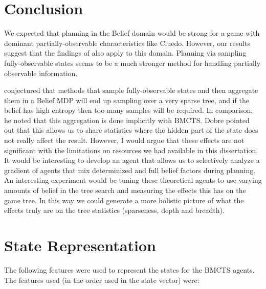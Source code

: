 \documentclass[msc, ai, twoside, notimes, logo, parskip, leftchapter, normalheadings]{infthesis}
\begin{document}
\chapter{Conclusion}
We expected that planning in the Belief domain would be strong for a game with dominant partially-observable characteristics like Cluedo. However, our results suggest that the findings of \citep{Mihai} also apply to this domain. Planning via sampling fully-observable states seems to be a much stronger method for handling partially observable information.

\citep{Mihai} conjectured that methods that sample fully-observable states and then aggregate them in a Belief MDP will end up sampling over a very sparse tree, and if the belief has high entropy then too many samples will be required. In comparison, he noted that this aggregation is done implicitly with BMCTS. Dobre pointed out that this allows us to share statistics where the hidden part of the state does not really affect the result. However, I would argue that these effects are not significant with the limitations on resources we had available in this dissertation. It would be interesting to develop an agent that allows us to selectively analyze a gradient of agents that mix determinized and full belief factors during planning. An interesting experiment would be tuning these theoretical agents to use varying amounts of belief in the tree search and measuring the effects this has on the game tree. In this way we could generate a more holistic picture of what the effects truly are on the tree statistics (sparseness, depth and breadth). 

\appendix
\chapter{State Representation}
The following features were used to represent the states for the BMCTS agents. The features used (in the order used in the state vector) were:
\end{document}
